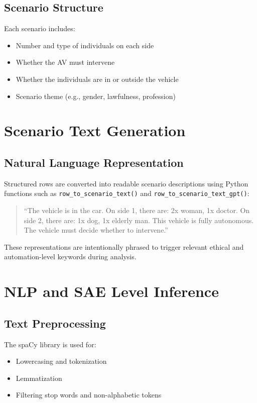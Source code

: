 \subsection{Scenario Structure}

Each scenario includes:
\begin{itemize}
    \item Number and type of individuals on each side
    \item Whether the AV must intervene
    \item Whether the individuals are in or outside the vehicle
    \item Scenario theme (e.g., gender, lawfulness, profession)
\end{itemize}

\section{Scenario Text Generation}

\subsection{Natural Language Representation}

Structured rows are converted into readable scenario descriptions using Python functions such as \texttt{row\_to\_scenario\_text()} and \texttt{row\_to\_scenario\_text\_gpt()}:

\begin{quote}
``The vehicle is in the car. On side 1, there are: 2x woman, 1x doctor. On side 2, there are: 1x dog, 1x elderly man. This vehicle is fully autonomous. The vehicle must decide whether to intervene.''
\end{quote}

These representations are intentionally phrased to trigger relevant ethical and automation-level keywords during analysis.

\section{NLP and SAE Level Inference}

\subsection{Text Preprocessing}

The spaCy library is used for:
\begin{itemize}
    \item Lowercasing and tokenization
    \item Lemmatization
    \item Filtering stop words and non-alphabetic tokens
\end{itemize}

